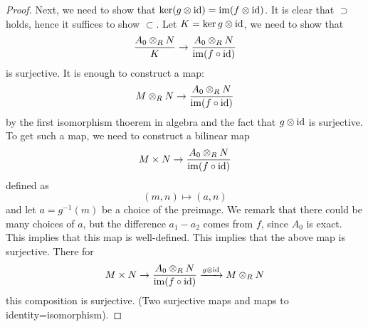 \begin{proof}
    Next, we need to show that $\ker(g\otimes\text{id})=\operatorname{im}(f\otimes\text{id})$. It is clear that $\supset$ holds, hence it suffices to show $\subset$. Let $K=\ker g\otimes\text{id}$, we need to show that 
    \begin{equation*}
        \frac{A_0\otimes_RN}{K}\to\frac{A_0\otimes_RN}{\operatorname{im}(f\circ\text{id})}
    \end{equation*}
    is surjective. It is enough to construct a map:
    \begin{equation*}
        M\otimes_RN\to\frac{A_0\otimes_RN}{\operatorname{im}(f\circ\text{id})}
    \end{equation*}
    by the first isomorphism thoerem in algebra and the fact that $g\otimes\text{id}$ is surjective. To get such a map, we need to construct a bilinear map 
    \begin{equation*}
        M\times N\to\frac{A_0\otimes_RN}{\operatorname{im}(f\circ\text{id})}
    \end{equation*}
    defined as
    \begin{equation*}
        (m,n)\mapsto (a, n)
    \end{equation*}
    and let $a=g^{-1}(m)$ be a choice of the preimage. We remark that there could be many choices of $a$, but the difference $a_1-a_2$ comes from $f$, since $A_0$ is exact. This implies that this map is well-defined. This implies that the above map is surjective. There for 
    \begin{equation*}
        M\times N\to\frac{A_0\otimes_RN}{\operatorname{im}(f\circ\text{id})}\xrightarrow{g\otimes\text{id}}M\otimes_RN
    \end{equation*}
    this composition is surjective. (Two surjective maps and maps to identity=isomorphism).
\end{proof}


